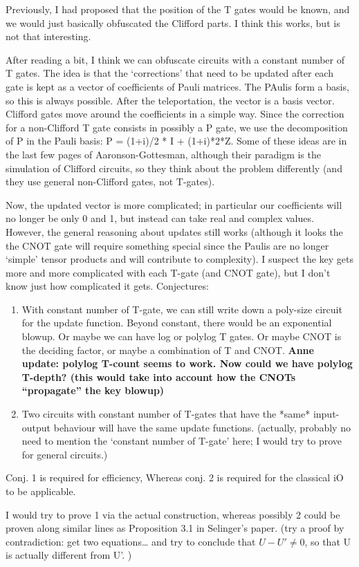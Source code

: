 Previously, I had proposed that the position of the T gates would be known, and we would just basically obfuscated the Clifford parts. I think this works, but is not that interesting.

After reading a bit, I think we can obfuscate circuits with a constant number of T gates. The idea is that the ‘corrections’ that need to be updated after each gate is kept as a vector of coefficients of Pauli matrices. The PAulis form a basis, so this is always possible. After the teleportation, the vector is a basis vector. Clifford gates move around the coefficients in a simple way. Since the correction for a non-Clifford T gate consists in possibly a P gate, we use the decomposition of P in the Pauli basis: P = (1+i)/2 * I + (1+i)*2*Z.  Some of these ideas are in the last few pages of Aaronson-Gottesman, although their paradigm is the simulation of Clifford circuits, so they think about the problem differently (and they use general non-Clifford gates, not T-gates).

Now, the updated vector is more complicated; in particular our coefficients will no longer be only 0 and 1, but instead can take real and complex values. However, the general reasoning about updates still works (although it looks the the CNOT gate will require something special since the Paulis are no longer ‘simple’ tensor products and will contribute to complexity). I suspect the key gets more and more complicated with each T-gate (and CNOT gate), but I don’t know just how complicated it gets.
Conjectures:

\begin{enumerate}
\item	With constant number of T-gate, we can still write down a poly-size circuit for the update function. Beyond constant, there would be an exponential blowup. Or maybe we can have log or polylog T gates. Or maybe CNOT is the deciding factor, or maybe a combination of T and CNOT. \textbf{Anne update: polylog T-count seems to work. Now could we have polylog T-depth? (this would take into account how the CNOTs ``propagate'' the key blowup)}
\item 	Two circuits with constant number of T-gates that have the *same* input-output behaviour will have the same update functions.  (actually, probably no need to mention the ‘constant number of T-gate’ here; I would try to prove for general circuits.)
\end{enumerate}

Conj. 1 is required for efficiency,
Whereas conj. 2 is required for the classical iO to be applicable.

I would try to prove 1 via the actual construction, whereas possibly 2 could be proven along similar lines as Proposition 3.1 in Selinger’s paper.  (try a proof by contradiction: get two equations… and try to conclude that $U-U' \neq 0$, so that U is actually different from U’. )



